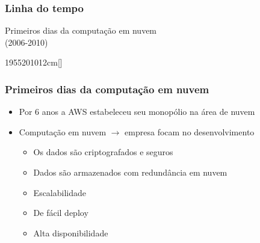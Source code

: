 \begin{frame}
	\frametitle{Linha do tempo}
	\begin{center}
		Primeiros dias da computação em nuvem \\
		(2006-2010)
	\end{center}
	\hfill
	\begin{scriptsize}
	\begin{bf}
	\begin{center}
		\begin{chronology}[10]{1955}{2010}{12cm}[\textwidth]
			\color{lightgreen}
		\end{chronology}
	\end{center}
	\end{bf}
	\end{scriptsize}
\end{frame}

\begin{frame}[allowframebreaks]
	\frametitle{Primeiros dias da computação em nuvem}
	\begin{itemize}
		\item Por 6 anos a AWS estabeleceu seu monopólio na área de nuvem
		\item Computação em nuvem $\rightarrow$ empresa focam no desenvolvimento
			\begin{itemize}
				\item Os dados são criptografados e seguros
				\item Dados são armazenados com redundância em nuvem
				\item Escalabilidade
				\item De fácil deploy
				\item Alta disponibilidade
			\end{itemize}
	\end{itemize}
\end{frame}

